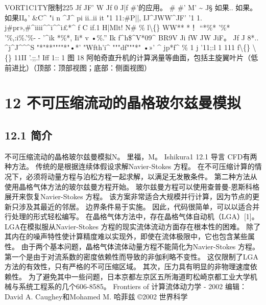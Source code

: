 \documentclass[UTF8,11pt,a4paper,openany,fontset=fandol]{ctexbook}
\begin{document}
VORT1C1TY限制225 Jf JF' W Jf 0 J|f \#'的应用。 \# \#' M' \textasciitilde{} J§ 如果.. 如果。 如果II。' \&C\textasciicircum{} "i n \textasciicircum{}J\textasciicircum{} pi ii..ii it "1 11:\#P||, IJ\textasciicircum{}JWW\textasciicircum{}JF' '1 1. j\#pr»,\#\textasciicircum{}iiii\textasciicircum{}\textasciicircum{}i\textasciicircum{}\textasciicircum{}i£*\textasciicircum{} f C if.1 H|Mlt! N\# \% l\textbackslash\{\} WW** *！ “*\%* '\%* '\%,:i\%.'\%- - '\textasciicircum{}ik *\%*, Ii* v •\%.” Ik f\textasciicircum{}h\$\textasciicircum{}V*09\textasciicircum{} BR9V Ji fW JW JiF。 Jf J 8*.. \textasciicircum{}j\textasciicircum{}J\textasciicircum{}\textasciicircum{}\textasciicircum{}S "*"**""""*"•*' "Wfth'i\textasciicircum{} """df"""*" •»' \textasciicircum{} jp*f\textasciicircum{} \% 1 j '11;:l 1 111 f\textbackslash\{\} \textbackslash\{\} 11II '.;;.! Iff 1:: 1 图 18 阿帕奇直升机的计算涡量等曲面，包括主旋翼叶片（低前进比）（顶部：顶部视图；底部：侧面视图）

\clearpage
\chapter{12 不可压缩流动的晶格玻尔兹曼模拟}
\section{12.1 简介}
不可压缩流动的晶格玻尔兹曼模拟N。 里福，M。 Ishikura1 12.1 导言 CFD有两种方法。 传统的是根据连续体假设求解Navier-Stokes 方程。 在不可压缩计算的情况下，必须将动量方程与泊松方程一起求解，以满足无发散条件。 第二种方法从使用晶格气体方法的玻尔兹曼方程开始。 玻尔兹曼方程可以使用查普曼-恩斯科格展开来恢复Navier-Stokes 方程。 该方案非常适合大规模并行计算，因为节点的更新只涉及其最近的邻居。 边界条件易于实施。 因此，代码很简单，可以以适合并行处理的形式轻松编写。 在晶格气体方法中，存在晶格气体自动机（LGA）[1]。 LGA在模拟服从Navier-Stokes 方程的现实流体流动方面存在根本性的困难。 除了其内在的噪声特性使计算精度难以实现外，即使在流体极限中，它也包含某些属性。 由于两个基本问题，晶格气体流体动量方程不能简化为Navier-Stokes 方程。 第一个是由于对流系数的密度依赖性而导致的非伽利略不变性。 这仅限制了LGA方法的有效性，只有严格的不可压缩区域。 其次，压力具有明显的非物理速度依赖性。 为了避免其中一些问题，日本京都左京区五所海道町松崎京都工业大学机械与系统工程系的几个606-8585。 Frontiers of 计算流体动力学 - 2002 编辑：David A. Caughey和Mohamed M. 哈菲兹 ©2002 世界科学
\end{document}
